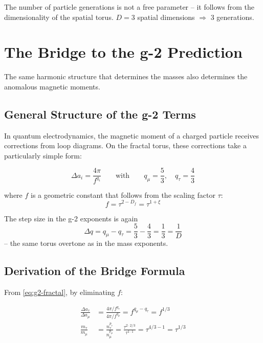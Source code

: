 	\begin{keypoint}
		The number of particle generations is not a free parameter -- it follows from the dimensionality of the spatial torus. $D = 3$ spatial dimensions $\Rightarrow$ 3 generations.
	\end{keypoint}


	\section{The Bridge to the g-2 Prediction}
	
	The same harmonic structure that determines the masses also determines the anomalous magnetic moments.
	
	\subsection{General Structure of the g-2 Terms}
	
	In quantum electrodynamics, the magnetic moment of a charged particle receives corrections from loop diagrams. On the fractal torus, these corrections take a particularly simple form:
	
	\begin{equation}
		\Delta a_i = \frac{4\pi}{f^{q_i}} \qquad \text{with} \qquad q_\mu = \frac{5}{3}, \quad q_\tau = \frac{4}{3}
		\label{eq:g2-fractal}
	\end{equation}
	
	where $f$ is a geometric constant that follows from the scaling factor $\tau$:
	\begin{equation}
		f = \tau^{2-D_f} = \tau^{1+\xi}
	\end{equation}
	
	The step size in the g-2 exponents is again
	\begin{equation}
		\Delta q = q_\mu - q_\tau = \frac{5}{3} - \frac{4}{3} = \frac{1}{3} = \frac{1}{D}
	\end{equation}
	-- the same torus overtone as in the mass exponents.
	
	\subsection{Derivation of the Bridge Formula}
	
	From \eqref{eq:g2-fractal}, by eliminating $f$:
	
	\begin{align}
		\frac{\Delta a_\tau}{\Delta a_\mu} &= \frac{4\pi/f^{q_\tau}}{4\pi/f^{q_\mu}} = f^{q_\mu - q_\tau} = f^{1/3} \\
		\frac{m_\tau}{m_\mu} &= \frac{n_\tau^{p_\tau}}{n_\mu^{p_\mu}} = \frac{\tau^{2 \cdot 2/3}}{\tau^{1 \cdot 1}} = \tau^{4/3 - 1} = \tau^{1/3}
	\end{align}
	
